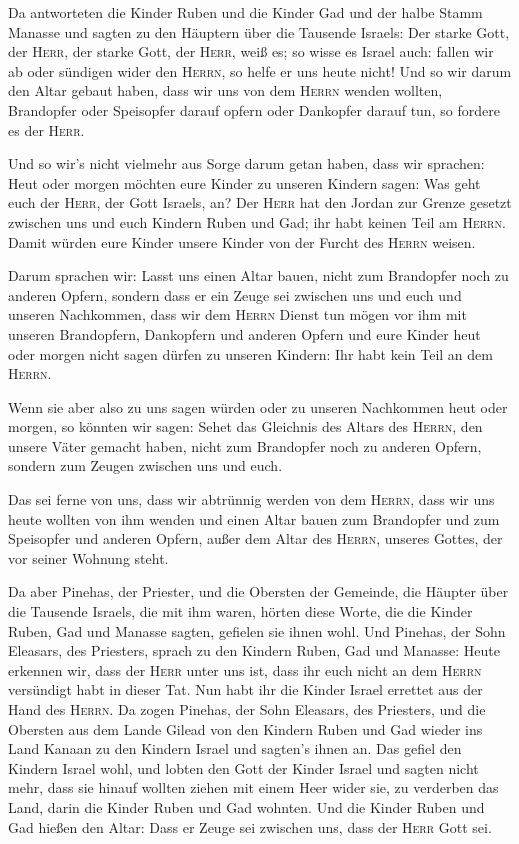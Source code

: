  Da antworteten die Kinder Ruben und die Kinder Gad und
der halbe Stamm Manasse und sagten zu den Häuptern über die Tausende
Israels:  Der starke Gott, der \textsc{Herr}, der starke
Gott, der \textsc{Herr}, weiß es; so wisse es Israel auch: fallen wir ab
oder sündigen wider den \textsc{Herrn}, so helfe er uns heute nicht!
 Und so wir darum den Altar gebaut haben, dass wir uns
von dem \textsc{Herrn} wenden wollten, Brandopfer oder Speisopfer darauf
opfern oder Dankopfer darauf tun, so fordere es der \textsc{Herr}.

 Und so wir's nicht vielmehr aus Sorge darum getan haben,
dass wir sprachen: Heut oder morgen möchten eure Kinder zu unseren
Kindern sagen: Was geht euch der \textsc{Herr}, der Gott Israels, an?
 Der \textsc{Herr} hat den Jordan zur Grenze gesetzt
zwischen uns und euch Kindern Ruben und Gad; ihr habt keinen Teil am
\textsc{Herrn}. Damit würden eure Kinder unsere Kinder von der Furcht
des \textsc{Herrn} weisen.

 Darum sprachen wir: Lasst uns einen Altar bauen, nicht
zum Brandopfer noch zu anderen Opfern,  sondern dass er
ein Zeuge sei zwischen uns und euch und unseren Nachkommen, dass wir dem
\textsc{Herrn} Dienst tun mögen vor ihm mit unseren Brandopfern,
Dankopfern und anderen Opfern und eure Kinder heut oder morgen nicht
sagen dürfen zu unseren Kindern: Ihr habt kein Teil an dem
\textsc{Herrn}.

 Wenn sie aber also zu uns sagen würden oder zu unseren
Nachkommen heut oder morgen, so könnten wir sagen: Sehet das Gleichnis
des Altars des \textsc{Herrn}, den unsere Väter gemacht haben, nicht zum
Brandopfer noch zu anderen Opfern, sondern zum Zeugen zwischen uns und
euch.

 Das sei ferne von uns, dass wir abtrünnig werden von dem
\textsc{Herrn}, dass wir uns heute wollten von ihm wenden und einen
Altar bauen zum Brandopfer und zum Speisopfer und anderen Opfern, außer
dem Altar des \textsc{Herrn}, unseres Gottes, der vor seiner Wohnung
steht.

 Da aber Pinehas, der Priester, und die Obersten der
Gemeinde, die Häupter über die Tausende Israels, die mit ihm waren,
hörten diese Worte, die die Kinder Ruben, Gad und Manasse sagten,
gefielen sie ihnen wohl.  Und Pinehas, der Sohn Eleasars,
des Priesters, sprach zu den Kindern Ruben, Gad und Manasse: Heute
erkennen wir, dass der \textsc{Herr} unter uns ist, dass ihr euch nicht
an dem \textsc{Herrn} versündigt habt in dieser Tat. Nun habt ihr die
Kinder Israel errettet aus der Hand des \textsc{Herrn}. 
Da zogen Pinehas, der Sohn Eleasars, des Priesters, und die Obersten aus
dem Lande Gilead von den Kindern Ruben und Gad wieder ins Land Kanaan zu
den Kindern Israel und sagten's ihnen an.  Das gefiel den
Kindern Israel wohl, und lobten den Gott der Kinder Israel und sagten
nicht mehr, dass sie hinauf wollten ziehen mit einem Heer wider sie, zu
verderben das Land, darin die Kinder Ruben und Gad wohnten.
 Und die Kinder Ruben und Gad hießen den Altar: Dass er
Zeuge sei zwischen uns, dass der \textsc{Herr} Gott sei.


